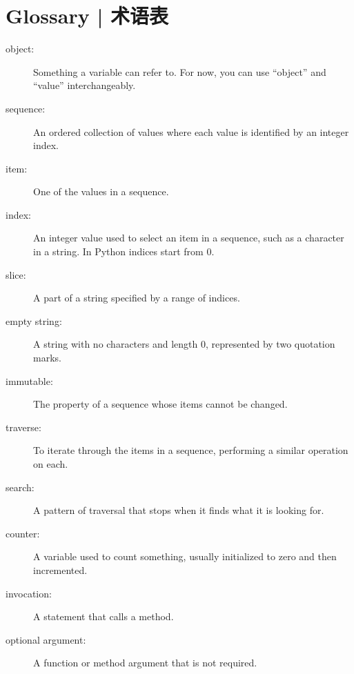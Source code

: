 \section{Glossary  |  术语表}

\begin{description}

\item[object:] Something a variable can refer to.  For now,
you can use ``object'' and ``value'' interchangeably.

\item[sequence:] An ordered collection of
values where each value is identified by an integer index.

\item[item:] One of the values in a sequence.

\item[index:] An integer value used to select an item in
a sequence, such as a character in a string.  In Python
indices start from 0.

\item[slice:] A part of a string specified by a range of indices.

\item[empty string:] A string with no characters and length 0, represented
by two quotation marks.

\item[immutable:] The property of a sequence whose items cannot
be changed.

\item[traverse:] To iterate through the items in a sequence,
performing a similar operation on each.

\item[search:] A pattern of traversal that stops
when it finds what it is looking for.

\item[counter:] A variable used to count something, usually initialized
to zero and then incremented.

\item[invocation:] A statement that calls a method.

\item[optional argument:] A function or method argument that is not
required.

\end{description}

